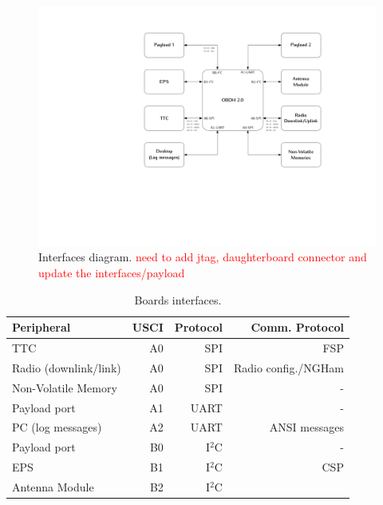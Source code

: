 \begin{figure}[!ht]
    \begin{center}
        \includegraphics[width=\textwidth]{figures/diagram_interfaces.pdf}
        \caption{Interfaces diagram. \textcolor{red}{need to add jtag, daughterboard connector and update the interfaces/payload}}
        \label{fig:diagram-interfaces}
    \end{center}
\end{figure}

\begin{table}[!h]
    \centering
    \begin{tabular}{lrrr}
        \toprule[1.5pt]
        \textbf{Peripheral}     & \textbf{USCI} & \textbf{Protocol} & \textbf{Comm. Protocol} \\
        \midrule
        TTC                     & A0            & SPI               & FSP \\
        Radio (downlink/link)   & A0            & SPI               & Radio config./NGHam \\
        Non-Volatile Memory     & A0            & SPI               & - \\
        Payload port            & A1            & UART              & -\footnotemark \\
        PC (log messages)       & A2            & UART              & ANSI messages \\
        Payload port            & B0            & I$^{2}$C          & -\footnotemark \\
        EPS                     & B1            & I$^{2}$C          & CSP \\
        Antenna Module          & B2            & I$^{2}$C          & \\
        \bottomrule[1.5pt]
    \end{tabular}
    \caption{Boards interfaces.}
    \label{tab:interfaces}
\end{table}

